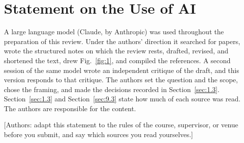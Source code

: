 \documentclass[journal]{IEEEtran}
\begin{document}
\section*{Statement on the Use of AI}

A large language model (Claude, by Anthropic) was used throughout the preparation of this review. Under the authors' direction it searched for papers, wrote the structured notes on which the review rests, drafted, revised, and shortened the text, drew Fig.~\ref{fig:1}, and compiled the references. A second session of the same model wrote an independent critique of the draft, and this version responds to that critique. The authors set the question and the scope, chose the framing, and made the decisions recorded in Section~\ref{sec:1.3}. Section~\ref{sec:1.3} and Section~\ref{sec:9.3} state how much of each source was read. The authors are responsible for the content.

[Authors: adapt this statement to the rules of the course, supervisor, or venue before you submit, and say which sources you read yourselves.]



\end{document}
